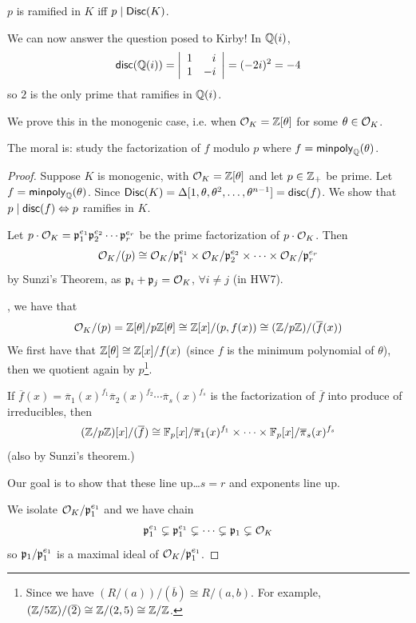 \begin{theorem}
    $p$ is ramified in $K$ iff $p\mid \operatorname{\mathsf{Disc}}(K)$.
\end{theorem}
\begin{example}
    We can now answer the question posed to Kirby! In $\mathbb Q(i)$,
    \[\operatorname{\mathsf{disc}}(\mathbb Q(i)) = \left|\begin{array}{rr}
            1 & i \\ 1 & -i
        \end{array}\right| = (-2i)^2 = -4\]
    so $2$ is the only prime that ramifies in $\mathbb Q(i)$.
\end{example}
We prove this in the monogenic case, i.e. when $\mathcal{O}_K = \mathbb Z[\theta]$ for some $\theta\in\mathcal{O}_K$.

The moral is: study the factorization of $f$ modulo $p$ where $f = \operatorname{\mathsf{minpoly}}_\mathbb Q(\theta)$.
\begin{proof}
    Suppose $K$ is monogenic, with $\mathcal{O}_K = \mathbb Z[\theta]$ and let $p\in\mathbb Z_+$ be prime. Let $f = \operatorname{\mathsf{minpoly}}_\mathbb Q(\theta)$. Since $\operatorname{\mathsf{Disc}}(K) = \Delta[1, \theta, \theta^2, \dots, \theta^{n-1}] = \operatorname{\mathsf{disc}}(f)$. We show that $p\mid \operatorname{\mathsf{disc}}(f) \Leftrightarrow p$ ramifies in $K$.

    Let $p\cdot \mathcal{O}_K = \mathfrak{p}_1^{e_1}\mathfrak{p}_2^{e_2}\cdots \mathfrak{p}_r^{e_r}$ be the prime factorization of $p\cdot \mathcal{O}_K$. Then
    \[\mathcal{O}_K/(p) \cong \mathcal{O}_K/\mathfrak{p}_1^{e_1}\times \mathcal{O}_K/\mathfrak{p}_2^{e_2}\times \cdots\times \mathcal{O}_K/\mathfrak{p}_r^{e_r}\]
    by Sunzi's Theorem, as $\mathfrak{p}_i + \mathfrak{p}_j = \mathcal{O}_K$, $\forall i\neq j$ (in HW7).

    \otoh, we have that
    \[\mathcal{O}_K/(p) = \mathbb Z[\theta]/p\mathbb Z[\theta]\cong \mathbb Z[x]/(p, f(x))\cong (\mathbb Z/p\mathbb Z)/(\overline{f}(x))\]
    We first have that $\mathbb Z[\theta]\cong \mathbb Z[x]/f(x)$ (since $f$ is the minimum polynomial of $\theta$), then we quotient again by $p$\footnote{Since we have $(R/(a))/(\overline{b}) \cong R/(a, b)$. For example, $(\mathbb Z/5\mathbb Z)/(\overline{2})\cong\mathbb Z/(2, 5)\cong \mathbb Z/\mathbb Z$.}.

    If $\overline{f}(x) = \overline{\pi}_1(x)^{f_1}\overline{\pi}_2(x)^{f_2}\cdots \overline{\pi}_s(x)^{f_s}$ is the factorization of $\overline{f}$ into produce of irreducibles, then
    \[(\mathbb Z/p\mathbb Z)[x]/(\overline{f})\cong \mathbb F_p[x]/\overline{\pi}_1(x)^{f_1}\times \cdots \times \mathbb F_p[x]/\overline{\pi}_s(x)^{f_s}\]
    (also by Sunzi's theorem.)

    Our goal is to show that these line up\dots $s = r$ and exponents line up.

    We isolate $\mathcal{O}_K / \mathfrak{p}_1^{e_1}$ and we have chain
    \[\mathfrak{p}_1^{e_1}\subsetneq \mathfrak{p}_1^{e_1}\subsetneq \cdots \subsetneq \mathfrak{p}_1 \subsetneq \mathcal{O}_K\]
    so $\mathfrak{p}_1 / \mathfrak{p}_1^{e_1}$ is a maximal ideal of $\mathcal{O}_K/\mathfrak{p}_1^{e_1}$.


\end{proof}
